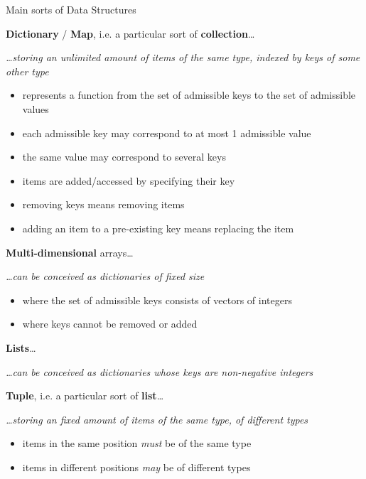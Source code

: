 \documentclass[presentation]{beamer}
\begin{document}
\begin{frame}[allowframebreaks]{Main sorts of Data Structures}
  \begin{block}{\textbf{Dictionary} / \textbf{Map}, i.e. a particular sort of \textbf{collection}\ldots}
    \begin{center}\itshape
      \ldots storing an \alert{unlimited} amount of items of the \alert{same type}, \alert{indexed by keys} of some \alert{other type}
    \end{center}
    \begin{itemize}
      \item represents a function from the \alert{set of admissible keys} to the \alert{set of admissible values}
      \item each admissible key may correspond to \alert{at most 1} admissible value
      \item the same value may correspond to several keys
      \item items are added/accessed by specifying their key
      \item removing keys means removing items
      \item adding an item to a pre-existing key means replacing the item
    \end{itemize}
  \end{block}

  \begin{exampleblock}{\textbf{Multi-dimensional} arrays\ldots}
    \begin{center}\itshape
      \ldots can be conceived as \alert{dictionaries} of \alert{fixed size}
    \end{center}
    \begin{itemize}
      \item where the set of admissible keys consists of \alert{vectors of integers}
      \item where keys cannot be removed or added
    \end{itemize}
  \end{exampleblock}

  \begin{exampleblock}{\textbf{Lists}\ldots}
    \begin{center}\itshape
      \ldots can be conceived as \alert{dictionaries} whose keys are \alert{non-negative integers}
    \end{center}
  \end{exampleblock}

  \begin{block}{\textbf{Tuple}, i.e. a particular sort of \textbf{list}\ldots}
    \begin{center}\itshape
      \ldots storing an \alert{fixed} amount of items of the \alert{same type}, of \alert{different types}
    \end{center}
    \begin{itemize}
      \item items in the \alert{same position} \emph{must} be of the \alert{same type}
      \item items in \alert{different positions} \emph{may} be of \alert{different types}
    \end{itemize}
  \end{block}


\end{frame}
\end{document}
